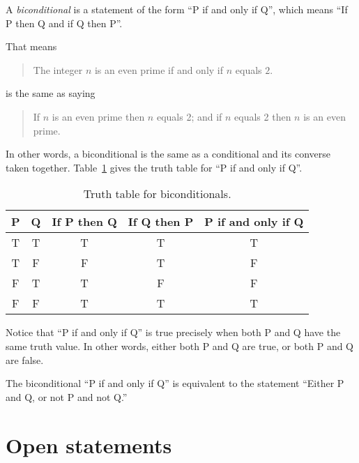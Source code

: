 \documentclass{tufte-book}
\begin{document}
\begin{definition}
  A \emph{biconditional} is a statement of the form ``P if and only if Q'', which means ``If P then Q and if Q then P''.
\end{definition}

That means
\begin{quote}
  The integer $n$ is an even prime if and only if $n$ equals $2$.
\end{quote}
is the same as saying
\begin{quote}
  If $n$ is an even prime then $n$ equals 2; and if $n$ equals 2 then $n$ is an even prime.
\end{quote}
In other words, a biconditional is the same as a conditional and its converse taken together. Table~\ref{tab:truth-table-iff} gives the truth table for ``P if and only if Q''.

\begin{table}
  \centering
  \begin{tabular}{ccccc}
    \toprule
    P & Q & If P then Q & If Q then P & P if and only if Q \\ \midrule
    T & T & T & T & T\\
    T & F & F & T & F\\
    F & T & T & F & F\\
    F & F & T & T & T\\ \bottomrule
  \end{tabular}
  \caption{Truth table for biconditionals.}
  \label{tab:truth-table-iff}
\end{table}

Notice that ``P if and only if Q'' is true precisely when both P and Q have the same truth value. In other words, either both P and Q are true, or both P and Q are false.

\begin{proposition}\label{prop:biconditional-equiv-or}
  The biconditional ``P if and only if Q'' is equivalent to the statement ``Either P and Q, or not P and not Q.''
\end{proposition}



\section{Open statements}
\label{sec:open-statements}
\end{document}
